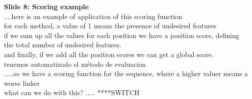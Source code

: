 \documentclass[a4paper,10pt]{article}
\begin{document}











\textbf{Slide 8: Scoring example}\\
....here is an example of application of this scoring function\\
for each method, a value of 1 means the presence of undesired features\\
if we sum up all the values for each position we have a position score, defining the total number of undesired features.\\
and finally, if we add all the position scores we can get a global score.\\
tenemos automatizado el método de evaluacion \\
.....so we have a scoring function for the sequence, where a higher valuer means a worse linker\\
 what can we do with this? ..... ****SWITCH\\
\end{document}
